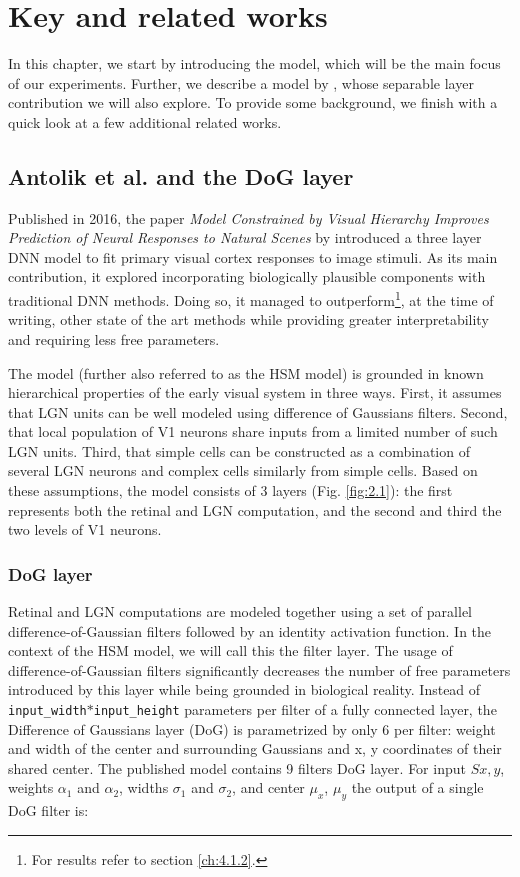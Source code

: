 \chapter{Key and related works}\label{ch:2}

In this chapter, we start by introducing the \cite{antolik} model, which will be the main focus of our experiments. Further, we describe a model by \cite{klindt}, whose separable layer contribution we will also explore. To provide some background, we finish with a quick look at a few additional related works.

\section{Antolik et al. and the DoG layer}

Published in 2016, the paper \textit{Model Constrained by Visual Hierarchy Improves Prediction of Neural Responses to Natural Scenes} by \cite{antolik} introduced a three layer DNN model to fit primary visual cortex responses to image stimuli. As its main contribution, it explored incorporating biologically plausible components with traditional DNN methods. Doing so, it managed to outperform\footnote{For results refer to section \ref{ch:4.1.2}.}, at the time of writing, other state of the art methods while providing greater interpretability and requiring less free parameters.

The model (further also referred to as the HSM model) is grounded in known hierarchical properties of the early visual system in three ways. First, it assumes that LGN units can be well modeled using difference of Gaussians filters. Second, that local population of V1 neurons share inputs from a limited number of such LGN units. Third, that simple cells can be constructed as a combination of several LGN neurons and complex cells similarly from simple cells. Based on these assumptions, the model consists of 3 layers (Fig. \ref{fig:2.1}): the first represents both the retinal and LGN computation, and the second and third the two levels of V1 neurons.

\subsection{DoG layer}\label{ch:2.1.1}

Retinal and LGN computations are modeled together using a set of parallel difference-of-Gaussian filters followed by an identity activation function. In the context of the HSM model, we will call this the filter layer. The usage of difference-of-Gaussian filters significantly decreases the number of free parameters introduced by this layer while being grounded in biological reality. Instead of \texttt{input\_width}$*$\texttt{input\_height} parameters per filter of a fully connected layer, the Difference of Gaussians layer (DoG) is parametrized by only 6 per filter: weight and width of the center and surrounding Gaussians and x, y coordinates of their shared center. The published model contains 9 filters DoG layer. For input $S{x,y}$, weights $\alpha_1$ and $\alpha_2$, widths $\sigma_1$ and $\sigma_2$, and center $\mu_x$, $\mu_y$ the output of a single DoG filter is:

